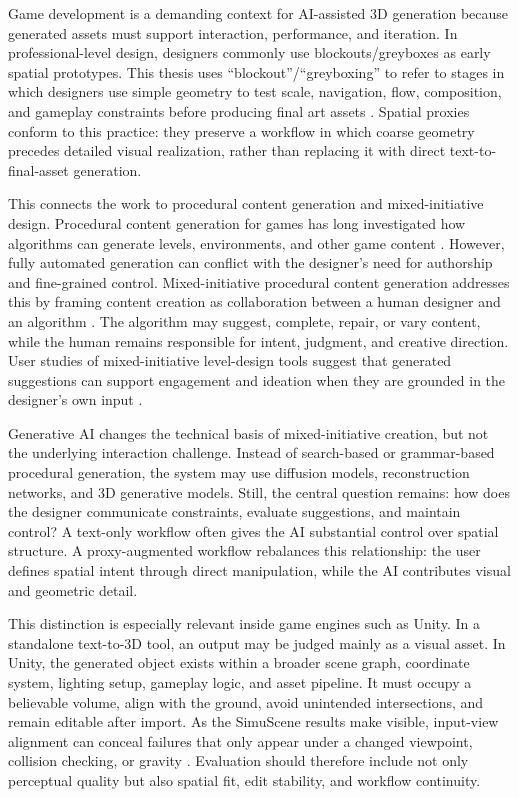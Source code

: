 \documentclass[11pt]{report}
\begin{document}
Game development is a demanding context for AI-assisted 3D generation because generated assets must support interaction, performance, and iteration. In professional-level design, designers commonly use blockouts/greyboxes as early spatial prototypes. This thesis uses ``blockout''/``greyboxing'' to refer to stages in which designers use simple geometry to test scale, navigation, flow, composition, and gameplay constraints before producing final art assets \cite{karlsson2023level,totten2019architectural,barclay2016pillars}. Spatial proxies conform to this practice: they preserve a workflow in which coarse geometry precedes detailed visual realization, rather than replacing it with direct text-to-final-asset generation.

This connects the work to procedural content generation and mixed-initiative design. Procedural content generation for games has long investigated how algorithms can generate levels, environments, and other game content \cite{hendrikx2013procedural}. However, fully automated generation can conflict with the designer's need for authorship and fine-grained control. Mixed-initiative procedural content generation addresses this by framing content creation as collaboration between a human designer and an algorithm \cite{liapis2016mixed}. The algorithm may suggest, complete, repair, or vary content, while the human remains responsible for intent, judgment, and creative direction. User studies of mixed-initiative level-design tools suggest that generated suggestions can support engagement and ideation when they are grounded in the designer's own input \cite{walton2020mixed}.

Generative AI changes the technical basis of mixed-initiative creation, but not the underlying interaction challenge. Instead of search-based or grammar-based procedural generation, the system may use diffusion models, reconstruction networks, and 3D generative models. Still, the central question remains: how does the designer communicate constraints, evaluate suggestions, and maintain control? A text-only workflow often gives the AI substantial control over spatial structure. A proxy-augmented workflow rebalances this relationship: the user defines spatial intent through direct manipulation, while the AI contributes visual and geometric detail.

This distinction is especially relevant inside game engines such as Unity. In a standalone text-to-3D tool, an output may be judged mainly as a visual asset. In Unity, the generated object exists within a broader scene graph, coordinate system, lighting setup, gameplay logic, and asset pipeline. It must occupy a believable volume, align with the ground, avoid unintended intersections, and remain editable after import. As the SimuScene results make visible, input-view alignment can conceal failures that only appear under a changed viewpoint, collision checking, or gravity \cite{lee2026simuscene}. Evaluation should therefore include not only perceptual quality but also spatial fit, edit stability, and workflow continuity.
\end{document}
